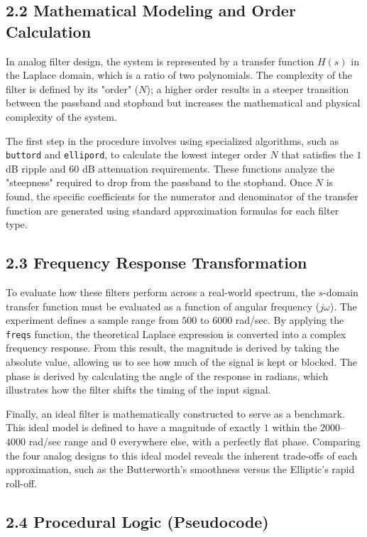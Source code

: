 \subsection*{2.2 Mathematical Modeling and Order Calculation}

In analog filter design, the system is represented by a transfer function $H(s)$ in the Laplace domain, which is a ratio of two polynomials. The complexity of the filter is defined by its "order" ($N$); a higher order results in a steeper transition between the passband and stopband but increases the mathematical and physical complexity of the system. 

The first step in the procedure involves using specialized algorithms, such as \texttt{buttord} and \texttt{ellipord}, to calculate the lowest integer order $N$ that satisfies the $1$ dB ripple and $60$ dB attenuation requirements. These functions analyze the "steepness" required to drop from the passband to the stopband. Once $N$ is found, the specific coefficients for the numerator and denominator of the transfer function are generated using standard approximation formulas for each filter type.

\subsection*{2.3 Frequency Response Transformation}

To evaluate how these filters perform across a real-world spectrum, the $s$-domain transfer function must be evaluated as a function of angular frequency ($j\omega$). The experiment defines a sample range from $500$ to $6000$ rad/sec. By applying the \texttt{freqs} function, the theoretical Laplace expression is converted into a complex frequency response. From this result, the magnitude is derived by taking the absolute value, allowing us to see how much of the signal is kept or blocked. The phase is derived by calculating the angle of the response in radians, which illustrates how the filter shifts the timing of the input signal. 

Finally, an ideal filter is mathematically constructed to serve as a benchmark. This ideal model is defined to have a magnitude of exactly $1$ within the $2000$--$4000$ rad/sec range and $0$ everywhere else, with a perfectly flat phase. Comparing the four analog designs to this ideal model reveals the inherent trade-offs of each approximation, such as the Butterworth’s smoothness versus the Elliptic’s rapid roll-off.

\subsection*{2.4 Procedural Logic (Pseudocode)}

